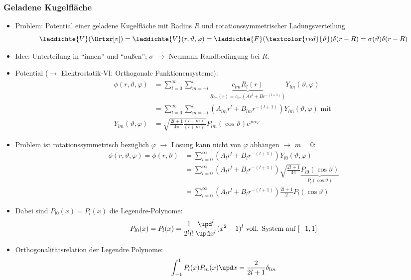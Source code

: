   \begin{frame}
    \frametitle{Geladene Kugelfläche}
\begin{itemize}[<+->]
\item Problem: Potential einer geladene Kugelfläche mit Radius $R$ und \alert{rotationssymmetrischer} Ladungsverteilung
  $$
  \laddichte{V} (\Ortsr[v]) =\laddichte{V} (r,\vartheta,\varphi) = \laddichte{F} (\textcolor{red}{\vartheta}) \delta(r-R) = \sigma(\vartheta) \delta(r-R) 
  $$
\item Idee: Unterteilung in \enquote{innen} und \enquote{außen}; $\sigma$ $\to$ Neumann Randbedingung bei $R$.
\item Potential ($\to$ Elektrostatik-VI: Orthogonale Funktionensysteme):
\begin{align*}
            \phi(r, \vartheta,\varphi) &= \sum_{l=0}^{\infty}\sum_{m=-l}^l  \underbrace{c_{lm} R_l(r)}_{R_{lm}(r)=c_{lm}(A r^l+ B r^{-(l+1)})} Y_{lm}(\vartheta,\varphi)\\
            &= \sum_{l=0}^{\infty}\sum_{m=-l}^l  (A_{lm} r^l+ B_{lm} r^{-(l+1)}) Y_{lm}(\vartheta,\varphi) \text{ mit } \\Y_{lm}(\vartheta,\varphi)&= \sqrt{\frac{2l+1}{4\pi}\frac{(l-m)!}{(l+m)!}} P_{lm}(\cos\vartheta) e^{jm\varphi}
\end{align*}
\end{itemize}
\end{frame}

\begin{frame}
 \begin{itemize}[<+->]
 \item Problem ist \alert{rotationssymmetrisch} bezüglich $\varphi$ $\to$ Lösung kann nicht von $\varphi$ abhängen $\to$ $m=0$:
   \begin{align*}
     \phi(r, \vartheta,\varphi) = \phi(r, \vartheta) &= \sum_{l=0}^{\infty} (A_{l} r^l+ B_{l} r^{-(l+1)}) Y_{l0}(\vartheta,\varphi)\\
                                                     &= \sum_{l=0}^{\infty} (A_{l} r^l+ B_{l} r^{-(l+1)}) \sqrt{\frac{2l+1}{4\pi}} \underbrace{P_{l0}(\cos\vartheta)}_{P_l (\cos\vartheta)}\\
     & = \sum_{l=0}^{\infty} (A_{l} r^l+ B_{l} r^{-(l+1)}) \frac{2l+1}{2} P_l (\cos\vartheta)
   \end{align*}
 \item Dabei sind $P_{l0}(x) = P_l(x)$ die \alert{Legendre-Polynome}:
   $$
   P_{l0}(x) = P_l(x) = \frac{1}{2^l l!} \frac{\upd^l}{\upd x^l} (x^2-1)^l \text{ voll. System auf } [-1,1]
   $$
 \item Orthogonalitätsrelation der Legendre Polynome:
   $$
   \int_{-1}^1 P_l(x)P_m(x) \upd x = \frac{2}{2l+1} \delta_{lm}
   $$
 \end{itemize}

\end{frame}

